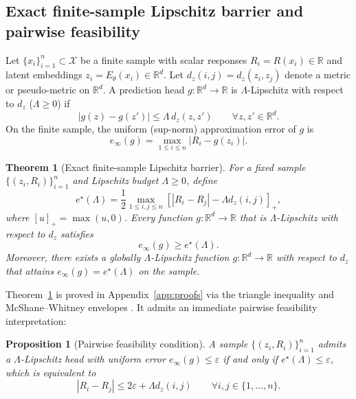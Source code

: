 \documentclass[preprint,11pt,a4paper]{elsarticle}
\newtheorem{theorem}{Theorem}
\newtheorem{proposition}{Proposition}
\newcommand{\R}{\mathbb{R}}
\newcommand{\X}{\mathcal{X}}
\begin{document}
\subsection{Exact finite-sample Lipschitz barrier and pairwise feasibility}
\label{sec:barrier}

Let $\{x_i\}_{i=1}^n\subset\X$ be a finite sample with scalar responses $R_i=R(x_i)\in\R$ and latent embeddings $z_i=E_\theta(x_i)\in\R^d$. Let $d_z(i,j)=d_z(z_i,z_j)$ denote a metric or pseudo-metric on $\R^d$. A prediction head $g:\R^d\to\R$ is $\Lambda$-Lipschitz with respect to $d_z$ ($\Lambda\ge 0$) if
\begin{equation}
|g(z)-g(z')|\le \Lambda\,d_z(z,z')
\qquad\forall z,z'\in\R^d.
\end{equation}
On the finite sample, the uniform (sup-norm) approximation error of $g$ is
\begin{equation}
e_\infty(g) = \max_{1\le i\le n}|R_i - g(z_i)|.
\end{equation}

\begin{theorem}[Exact finite-sample Lipschitz barrier]
\label{thm:barrier}
For a fixed sample $\{(z_i,R_i)\}_{i=1}^n$ and Lipschitz budget $\Lambda\ge 0$, define
\begin{equation}
\boxed{
e^\star(\Lambda)
=
\frac12
\max_{1\le i,j\le n}
\left[
|R_i-R_j|
-
\Lambda d_z(i,j)
\right]_+ ,
}
\label{eq:estar}
\end{equation}
where $[u]_+=\max(u,0)$. Every function $g:\R^d\to\R$ that is $\Lambda$-Lipschitz with respect to $d_z$ satisfies
\begin{equation}
e_\infty(g)\ge e^\star(\Lambda).
\end{equation}
Moreover, there exists a globally $\Lambda$-Lipschitz function $g:\R^d\to\R$ with respect to $d_z$ that attains $e_\infty(g)=e^\star(\Lambda)$ on the sample.
\end{theorem}

Theorem~\ref{thm:barrier} is proved in Appendix~\ref{app:proofs} via the triangle inequality and McShane--Whitney envelopes \cite{McShane1934,Beliakov2006,Calliess2017}. It admits an immediate pairwise feasibility interpretation:

\begin{proposition}[Pairwise feasibility condition]
\label{prop:feasibility}
A sample $\{(z_i,R_i)\}_{i=1}^n$ admits a $\Lambda$-Lipschitz head with uniform error $e_\infty(g)\le\varepsilon$ if and only if $e^\star(\Lambda)\le\varepsilon$, which is equivalent to
\begin{equation}
|R_i-R_j|\le 2\varepsilon + \Lambda d_z(i,j)
\qquad\forall i,j\in\{1,\dots,n\}.
\label{eq:pair-feasibility}
\end{equation}
\end{proposition}
\end{document}
